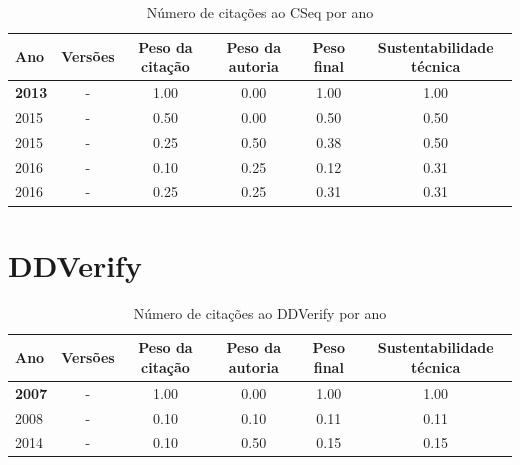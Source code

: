 \begin{table}[H]
\caption{Número de citações ao CSeq por ano}
\centering
\begin{tabular}{| l | c | c | c | c | c |}
  \hline
  Ano & Versões & Peso da citação & Peso da autoria & Peso final & Sustentabilidade técnica \\
  \hline
            {\bf 2013}
          &
          -
          &
          1.00
          &
          0.00
          &
          1.00
          &
            {\color{blue} 1.00}
          \\
\hline
            2015
          &
          -
          &
          0.50
          &
          0.00
          &
          0.50
          &
            {\color{blue} 0.50}
          \\
            2015
          &
          -
          &
          0.25
          &
          0.50
          &
          0.38
          &
            {\color{blue} 0.50}
          \\
\hline
            2016
          &
          -
          &
          0.10
          &
          0.25
          &
          0.12
          &
            {\color{red} 0.31}
          \\
            2016
          &
          -
          &
          0.25
          &
          0.25
          &
          0.31
          &
            {\color{red} 0.31}
          \\
\hline
\end{tabular}
\end{table}



\section{DDVerify}


\begin{table}[H]
\caption{Número de citações ao DDVerify por ano}
\centering
\begin{tabular}{| l | c | c | c | c | c |}
  \hline
  Ano & Versões & Peso da citação & Peso da autoria & Peso final & Sustentabilidade técnica \\
  \hline
            {\bf 2007}
          &
          -
          &
          1.00
          &
          0.00
          &
          1.00
          &
            {\color{blue} 1.00}
          \\
\hline
            2008
          &
          -
          &
          0.10
          &
          0.10
          &
          0.11
          &
            {\color{red} 0.11}
          \\
\hline
            2014
          &
          -
          &
          0.10
          &
          0.50
          &
          0.15
          &
            {\color{red} 0.15}
          \\
\hline
\end{tabular}
\end{table}



